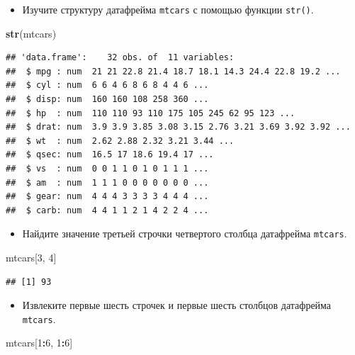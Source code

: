 \documentclass[]{book}
\newenvironment{Shaded}{\begin{snugshade}}{\end{snugshade}}
\newcommand{\KeywordTok}[1]{\textcolor[rgb]{0.13,0.29,0.53}{\textbf{#1}}}
\newcommand{\DecValTok}[1]{\textcolor[rgb]{0.00,0.00,0.81}{#1}}
\newcommand{\OperatorTok}[1]{\textcolor[rgb]{0.81,0.36,0.00}{\textbf{#1}}}
\newcommand{\NormalTok}[1]{#1}
\providecommand{\tightlist}{%
  \setlength{\itemsep}{0pt}\setlength{\parskip}{0pt}}
\begin{document}
\begin{itemize}
\tightlist
\item
  Изучите структуру датафрейма \texttt{mtcars} с помощью функции
  \texttt{str()}.
\end{itemize}

\begin{Shaded}
\begin{Highlighting}[]
\KeywordTok{str}\NormalTok{(mtcars)}
\end{Highlighting}
\end{Shaded}

\begin{verbatim}
## 'data.frame':    32 obs. of  11 variables:
##  $ mpg : num  21 21 22.8 21.4 18.7 18.1 14.3 24.4 22.8 19.2 ...
##  $ cyl : num  6 6 4 6 8 6 8 4 4 6 ...
##  $ disp: num  160 160 108 258 360 ...
##  $ hp  : num  110 110 93 110 175 105 245 62 95 123 ...
##  $ drat: num  3.9 3.9 3.85 3.08 3.15 2.76 3.21 3.69 3.92 3.92 ...
##  $ wt  : num  2.62 2.88 2.32 3.21 3.44 ...
##  $ qsec: num  16.5 17 18.6 19.4 17 ...
##  $ vs  : num  0 0 1 1 0 1 0 1 1 1 ...
##  $ am  : num  1 1 1 0 0 0 0 0 0 0 ...
##  $ gear: num  4 4 4 3 3 3 3 4 4 4 ...
##  $ carb: num  4 4 1 1 2 1 4 2 2 4 ...
\end{verbatim}

\begin{itemize}
\tightlist
\item
  Найдите значение третьей строчки четвертого столбца датафрейма
  \texttt{mtcars}.
\end{itemize}

\begin{Shaded}
\begin{Highlighting}[]
\NormalTok{mtcars[}\DecValTok{3}\NormalTok{, }\DecValTok{4}\NormalTok{]}
\end{Highlighting}
\end{Shaded}

\begin{verbatim}
## [1] 93
\end{verbatim}

\begin{itemize}
\tightlist
\item
  Извлеките первые шесть строчек и первые шесть столбцов датафрейма
  \texttt{mtcars}.
\end{itemize}

\begin{Shaded}
\begin{Highlighting}[]
\NormalTok{mtcars[}\DecValTok{1}\OperatorTok{:}\DecValTok{6}\NormalTok{, }\DecValTok{1}\OperatorTok{:}\DecValTok{6}\NormalTok{]}
\end{Highlighting}
\end{Shaded}
\end{document}
